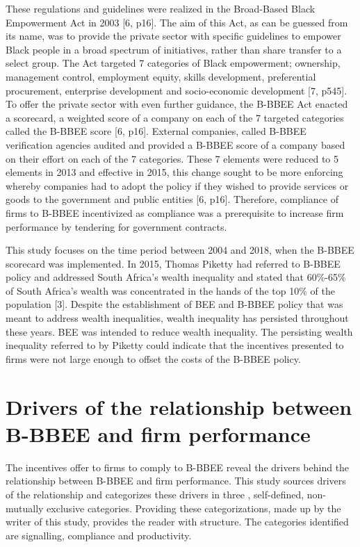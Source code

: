 These regulations and guidelines were realized in the Broad-Based Black Empowerment Act in 2003 [6, p16]. The aim of this Act, as can be guessed from its name, was to provide the private sector with specific guidelines to empower Black people in a broad spectrum of initiatives, rather than share transfer to a select group. The Act targeted 7 categories of Black empowerment; ownership, management control, employment equity, skills development, preferential procurement, enterprise development and socio-economic development [7,  p545]. To offer the private sector with even further guidance, the B-BBEE Act enacted a scorecard, a weighted score of a company on each of the 7 targeted categories called the B-BBEE score [6, p16]. External companies, called B-BBEE verification agencies audited and provided a B-BBEE score of a company based on their effort on each of the 7 categories. These 7 elements were reduced to 5 elements in 2013 and effective in 2015, this change sought to be more enforcing whereby companies had to adopt the policy if they wished to provide services or goods to the government and public entities [6, p16]. Therefore, compliance of firms to B-BBEE incentivized as compliance was a prerequisite to increase firm performance by tendering for government contracts.

This study focuses on the time period between 2004 and 2018, when the B-BBEE scorecard was implemented. In 2015, Thomas Piketty had referred to B-BBEE policy and addressed South Africa’s wealth inequality and stated that 60\%-65\% of South Africa’s wealth was concentrated in the hands of the top 10\% of the population [3]. Despite the establishment of BEE and B-BBEE policy that was meant to address wealth inequalities, wealth inequality has persisted throughout these years. BEE was intended to reduce wealth inequality. The persisting wealth inequality referred to by Piketty could indicate that the incentives presented to firms were not large enough to offset the costs of the B-BBEE policy. 

\section{Drivers of the relationship between B-BBEE and firm performance}
The incentives offer to firms to comply to B-BBEE reveal the drivers behind the relationship between B-BBEE and firm performance. This study sources drivers of the relationship and categorizes these drivers in three , self-defined, non-mutually exclusive categories. Providing these categorizations, made up by the writer of this study, provides the reader with structure. The categories identified are signalling, compliance and productivity.

